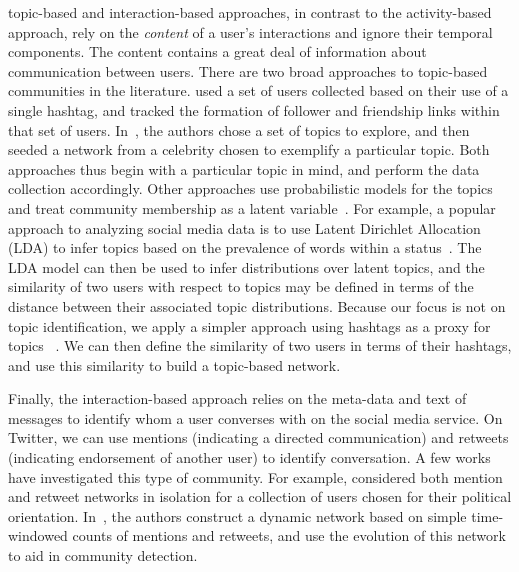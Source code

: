 \DIFdelbegin {}\DIFdelend \DIFaddbegin {}\DIFaddend topic-based and interaction-based approaches, in contrast to the activity-based approach, rely on the \emph{content} of a user's interactions and ignore their temporal components. The content contains a great deal of information about communication between users.
There are two broad approaches to topic-based communities in the literature. \cite{rossi2012conversation} used a set of users collected based on their use of a single hashtag, and tracked the formation of follower and friendship links within that set of users. In~\cite{lim2012following}, the authors chose a set of topics to explore, and then seeded a network from a celebrity chosen to exemplify a particular topic. Both approaches thus begin with a particular topic in mind, and perform the data collection accordingly. Other approaches use probabilistic models for the topics and treat community membership as a latent variable~\cite{yin2012latent}.
For example, a popular approach to analyzing social media data is to use Latent Dirichlet Allocation (LDA) to infer topics based on the prevalence of words within a status~\cite{zhao2011comparing,michelson2010discovering}. The LDA model can then be used to infer distributions over latent topics, and the similarity of two users with respect to topics may be defined in terms of the distance between their associated topic distributions. Because our focus is not on topic identification, we apply a simpler approach using hashtags as a proxy for topics \DIFaddbegin {}\DIFaddend ~\cite{becker2011beyond,tsur2012s}. We can then define the similarity of two users in terms of their hashtags, and use this similarity to build a topic-based network.

Finally, the interaction-based approach relies on the meta-data and text of messages to identify whom a user converses with on the social media service. On Twitter, we can use mentions (indicating a directed communication) and retweets (indicating endorsement of another user) to identify conversation. 
\DIFdelbegin {}\DIFdelend A few works have investigated this type of community. For example, \cite{conover2011political} considered both mention and retweet networks in isolation for a collection of users chosen for their political orientation. In~\cite{deitrick2013mutually}, the authors construct a dynamic network based on simple time-windowed counts of mentions and retweets, and use the evolution of this network to aid in community detection.

